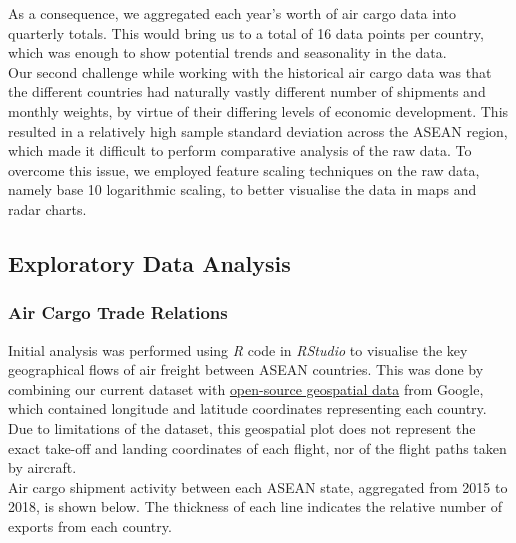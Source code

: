 \documentclass{article}
\begin{document}
\noindent As a consequence, we aggregated each year's worth of air cargo data into quarterly totals. This would bring us to a total of 16 data points per country, which was enough to show potential trends and seasonality in the data. \\

\noindent Our second challenge while working with the historical air cargo data was that the different countries had naturally vastly different number of shipments and monthly weights, by virtue of their differing levels of economic development. This resulted in a relatively high sample standard deviation across the ASEAN region, which made it difficult to perform comparative analysis of the raw data. To overcome this issue, we employed feature scaling techniques on the raw data, namely base 10 logarithmic scaling, to better visualise the data in maps and radar charts. 

\subsection{Exploratory Data Analysis}

\subsubsection{Air Cargo Trade Relations}

Initial analysis was performed using \textit{R} code in \textit{RStudio} to visualise the key geographical flows of air freight between ASEAN countries. This was done by combining our current dataset with \href{https://github.com/google/dspl}{open-source geospatial data} from Google, which contained longitude and latitude coordinates representing each country. Due to limitations of the dataset, this geospatial plot does not represent the exact take-off and landing coordinates of each flight, nor of the flight paths taken by aircraft. \\ 

\noindent Air cargo shipment activity between each ASEAN state, aggregated from 2015 to 2018, is shown below. The thickness of each line indicates the relative number of exports from each country. \\
\end{document}
